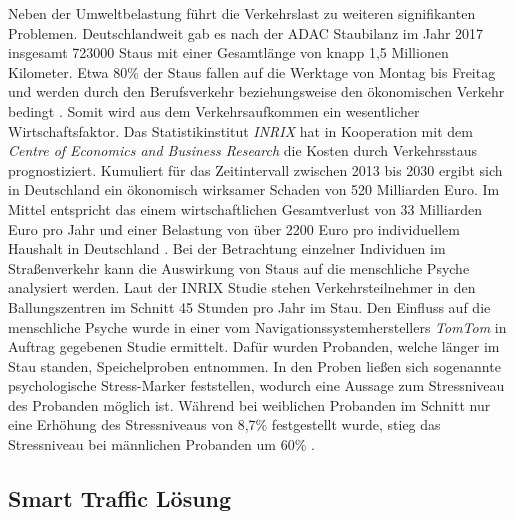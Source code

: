 Neben der Umweltbelastung führt die Verkehrslast zu weiteren signifikanten Problemen. Deutschlandweit gab es nach der ADAC Staubilanz im Jahr 2017 insgesamt 723000 Staus mit einer Gesamtlänge von knapp 1,5 Millionen Kilometer. Etwa 80\% der Staus fallen auf die Werktage von Montag bis Freitag und werden durch den Berufsverkehr beziehungsweise den ökonomischen Verkehr bedingt \citep[vgl.][]{ADAC.2018}. Somit wird aus dem Verkehrsaufkommen ein wesentlicher Wirtschaftsfaktor. Das Statistikinstitut \emph{INRIX} hat in Kooperation mit dem \emph{Centre of Economics and Business Research} die Kosten durch Verkehrsstaus prognostiziert. Kumuliert für das Zeitintervall zwischen 2013 bis 2030 ergibt sich in Deutschland ein ökonomisch wirksamer Schaden von 520 Milliarden Euro. Im Mittel entspricht das einem wirtschaftlichen Gesamtverlust von 33 Milliarden Euro pro Jahr und einer Belastung von über 2200 Euro pro individuellem Haushalt in Deutschland \citep[vgl.][]{INRIX.2014}. Bei der Betrachtung einzelner Individuen im Straßenverkehr kann die Auswirkung von Staus auf die menschliche Psyche analysiert werden. Laut der INRIX Studie stehen Verkehrsteilnehmer in den Ballungszentren im Schnitt 45 Stunden pro Jahr im Stau. Den Einfluss auf die menschliche Psyche wurde in einer vom Navigationssystemherstellers \emph{TomTom} in Auftrag gegebenen Studie ermittelt. Dafür wurden Probanden, welche länger im Stau standen, Speichelproben entnommen. In den Proben ließen sich sogenannte psychologische Stress-Marker feststellen, wodurch eine Aussage zum Stressniveau des Probanden möglich ist. Während bei weiblichen Probanden im Schnitt nur eine Erhöhung des Stressniveaus von 8,7\% festgestellt wurde, stieg das Stressniveau bei männlichen Probanden um 60\% \citep[vgl.][]{TomTom.2011}. 

\subsection{Smart Traffic Lösung}
%

